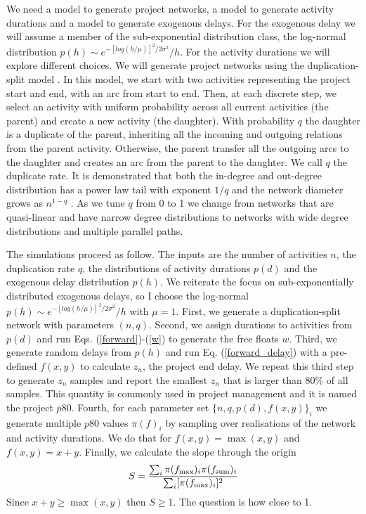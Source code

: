 \documentclass[reprint,aps,prl,amsmath,amssymb,superscriptaddress,showpacs]{revtex4-1}
\begin{document}
We need a model to generate project networks, a model to generate activity durations and a model to generate exogenous delays. For the exogenous delay we will assume a member of the sub-exponential distribution class, the log-normal distribution $p(h)\sim e^{-[log(h/\mu)]^2/2\sigma^2}/h$. For the activity durations we will explore different choices. We will generate project networks using the duplication-split model \cite{vazquez22}. In this model, we start with two activities representing the project start and end, with an arc from start to end. Then, at each discrete step, we select an activity with uniform probability across all current activities (the parent) and create a new activity (the daughter). With probability $q$ the daughter is a duplicate of the parent, inheriting all the incoming and outgoing relations from the parent activity. Otherwise, the parent transfer all the outgoing arcs to the daughter and creates an arc from the parent to the daughter. We call $q$ the duplicate rate.  It is demonstrated that both the in-degree and out-degree distribution has a power law tail with exponent $1/q$ and the network diameter grows as $n^{1-q}$ \cite{vazquez22}. As we tune $q$ from 0 to 1 we change from networks that are quasi-linear and have narrow degree distributions to networks with wide degree distributions and multiple parallel paths.

The simulations proceed as follow. The inputs are the number of activities $n$, the duplication rate $q$, the distributions of activity durations $p(d)$ and the exogenous delay distribution $p(h)$. We reiterate the focus on sub-exponentially distributed exogenous delays, so I choose the log-normal $p(h)\sim e^{-[log(h/\mu)]^2/2\sigma^2}/h$ with $\mu=1$. First, we generate a duplication-split network  with parameters $(n,q)$. Second, we assign durations to activities from $p(d)$ and run Eqs. (\ref{forward})-(\ref{w}) to generate the free floats $w$. Third, we generate random delays from $p(h)$ and run Eq. (\ref{forward_delay}) with a pre-defined $f(x,y)$ to calculate $z_n$, the project end delay. We repeat this third step to generate $z_n$ samples and report the smallest $z_n$ that is larger than 80\% of all samples. This quantity is commonly used in project management and it is named the project $p80$. Fourth, for each parameter set $\{n,q,p(d),f(x,y)\}_i$ we generate multiple $p80$ values $\pi(f)_i$ by sampling over realisations of the network and activity durations. We do that for $f(x,y)=\max(x,y)$ and $f(x,y)=x+y$. Finally, we calculate the slope through the origin
%
\begin{equation}
S = \frac{ \sum_i \pi(f_{\max})_i \pi(f_{\rm sum})_i }{ \sum_i [\pi(f_{\max})_i]^2 }
\label{slope}
\end{equation}
%
Since $x+y\geq\max(x,y)$ then $S\geq1$. The question is how close to 1.
\end{document}
